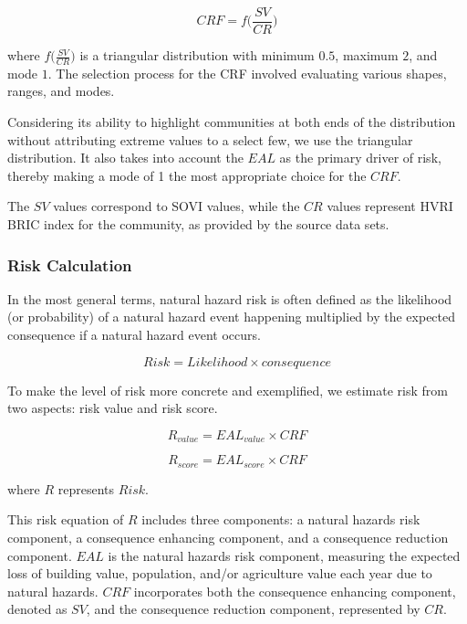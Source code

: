 \documentclass{mcmthesis}
\begin{document}
\begin{equation}
CRF = f\Big( \frac{SV}{CR} \Big)
\end{equation}

\noindent where $f\Big( \frac{SV}{CR} \Big)$ is a triangular distribution with minimum $0.5$, maximum $2$, and mode $1$.
The selection process for the CRF involved evaluating various shapes, ranges, and modes.

Considering its ability to highlight communities at both ends of the distribution without attributing
extreme values to a select few, we use the triangular distribution. It also takes into account
the $EAL$ as the primary driver of risk, thereby making a mode of 1 the most appropriate choice
for the $CRF$.

The $SV$ values correspond to SOVI values, while the $CR$ values represent HVRI BRIC
index for the community, as provided by the source data sets.

\subsubsection{Risk Calculation}

In the most general terms, natural hazard risk is often defined as the likelihood (or probability)
of a natural hazard event happening multiplied by the expected consequence if a natural
hazard event occurs.

\begin{equation}
Risk = Likelihood \times consequence
\end{equation}

To make the level of risk more concrete and exemplified, we estimate risk from two aspects:
risk value and risk score.

\begin{equation} 
R_{value} = EAL_{value} \times CRF  \label{eq8}
\end{equation} 

\begin{equation} 
R_{score} = EAL_{score} \times CRF  \label{eq9}
\end{equation} 

\noindent where $R$ represents $Risk$.

This risk equation of $R$ includes three components: a natural hazards risk component, a
consequence enhancing component, and a consequence reduction component. $EAL$ is the natural
hazards risk component, measuring the expected loss of building value, population, and/or
agriculture value each year due to natural hazards. $CRF$ incorporates both the consequence
enhancing component, denoted as $SV$, and the consequence reduction component, represented
by $CR$.
\end{document}
